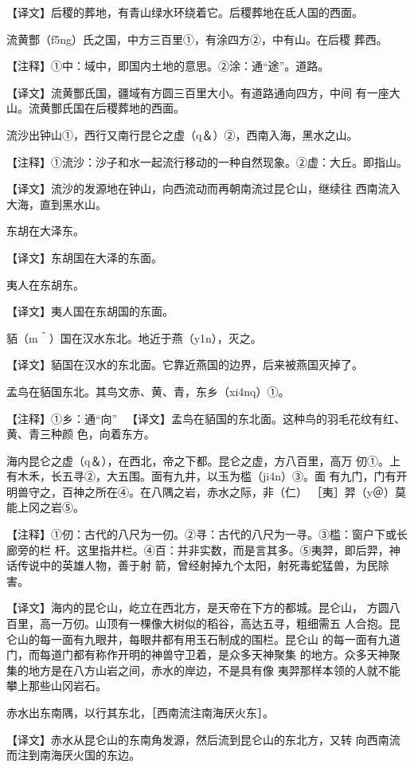 \documentclass[a4paper,12pt,UTF8,twoside]{ctexbook}
\begin{document}
【译文】后稷的葬地，有青山绿水环绕着它。后稷葬地在氐人国的西面。

流黄酆（f5ng）氏之国，中方三百里①，有涂四方②，中有山。在后稷 葬西。

【注释】①中：域中，即国内土地的意思。②涂：通“途”。道路。

【译文】流黄酆氏国，疆域有方圆三百里大小。有道路通向四方，中间 有一座大山。流黄酆氏国在后稷葬地的西面。

流沙出钟山①，西行又南行昆仑之虚（q＆）②，西南入海，黑水之山。

【注释】①流沙：沙子和水一起流行移动的一种自然现象。②虚：大丘。即指山。

【译文】流沙的发源地在钟山，向西流动而再朝南流过昆仑山，继续往 西南流入大海，直到黑水山。

东胡在大泽东。

【译文】东胡国在大泽的东面。

夷人在东胡东。

【译文】夷人国在东胡国的东面。

貊（m＾）国在汉水东北。地近于燕（y1n），灭之。

【译文】貊国在汉水的东北面。它靠近燕国的边界，后来被燕国灭掉了。

孟鸟在貊国东北。其鸟文赤、黄、青，东乡（xi4nq）①。

【注释】①乡：通“向” 　【译文】孟鸟在貊国的东北面。这种鸟的羽毛花纹有红、黄、青三种颜 色，向着东方。

海内昆仑之虚（q＆），在西北，帝之下都。昆仑之虚，方八百里，高万 仞①。上有木禾，长五寻②，大五围。面有九井，以玉为槛（ji4n）③。面 有九门，门有开明兽守之，百神之所在④。在八隅之岩，赤水之际，非（仁） ［夷］羿（y＠）莫能上冈之岩⑤。

【注释】①仞：古代的八尺为一仞。②寻：古代的八尺为一寻。③槛：窗户下或长廊旁的栏 杆。这里指井栏。④百：并非实数，而是言其多。⑤夷羿，即后羿，神话传说中的英雄人物，善于射 箭，曾经射掉九个太阳，射死毒蛇猛兽，为民除害。

【译文】海内的昆仑山，屹立在西北方，是天帝在下方的都城。昆仑山， 方圆八百里，高一万仞。山顶有一棵像大树似的稻谷，高达五寻，粗细需五 人合抱。昆仑山的每一面有九眼井，每眼井都有用玉石制成的围栏。昆仑山 的每一面有九道门，而每道门都有称作开明的神兽守卫着，是众多天神聚集 的地方。众多天神聚集的地方是在八方山岩之间，赤水的岸边，不是具有像 夷羿那样本领的人就不能攀上那些山冈岩石。

赤水出东南隅，以行其东北，［西南流注南海厌火东］。

【译文】赤水从昆仑山的东南角发源，然后流到昆仑山的东北方，又转 向西南流而注到南海厌火国的东边。
\end{document}
